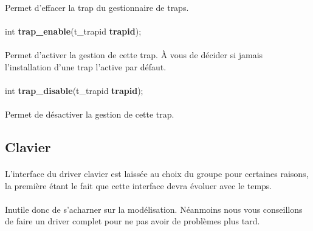\documentclass[10pt,a4wide]{article}
\begin{document}
\paragraph{}

Permet d'effacer la trap du gestionnaire de traps.

\paragraph{}

\hspace{1.5cm}int \textbf{trap\_enable}(t\_trapid \textbf{trapid});

\paragraph{}

Permet d'activer la gestion de cette trap. \`A vous de d\'ecider si jamais
l'installation d'une trap l'active par d\'efaut.

\paragraph{}

\hspace{1.5cm}int \textbf{trap\_disable}(t\_trapid \textbf{trapid});

\paragraph{}

Permet de d\'esactiver la gestion de cette trap.

\subsection{Clavier}

\paragraph{}

L'interface du driver clavier est laiss\'ee au choix du groupe pour certaines
raisons, la premi\`ere \'etant le fait que cette interface devra \'evoluer
avec le temps.

\paragraph{}

Inutile donc de s'acharner sur la mod\'elisation. N\'eanmoins nous vous
conseillons de faire un driver complet pour ne pas avoir de probl\`emes
plus tard.
\end{document}
